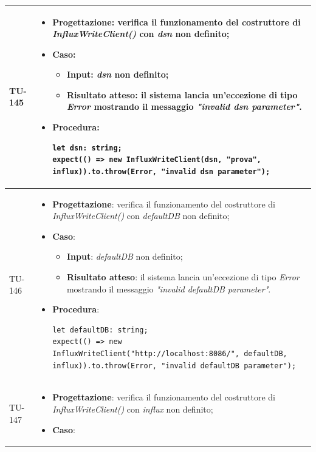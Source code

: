 \begin{longtable}{|C{1.5cm}|C{14.5cm}|}
\\ \hline
{TU-145} &
\begin{itemize}
	\item \textbf{Progettazione}: verifica il funzionamento del costruttore di \emph{InfluxWriteClient()} con \emph{dsn} non definito;
	\item \textbf{Caso}: 
	\begin{itemize}
		\item \textbf{Input}: \emph{dsn} non definito;
		\item \textbf{Risultato atteso}: il sistema lancia un'eccezione di tipo \emph{Error} mostrando il messaggio \emph{"invalid dsn parameter"}.
	\end{itemize}
	\item \textbf{Procedura}:
	\begin{lstlisting}
let dsn: string;
expect(() => new InfluxWriteClient(dsn, "prova", influx)).to.throw(Error, "invalid dsn parameter");
	\end{lstlisting}
\end{itemize}\\
\hline
{TU-146} &
\begin{itemize}
	\item \textbf{Progettazione}: verifica il funzionamento del costruttore di \emph{InfluxWriteClient()} con \emph{defaultDB} non definito;
	\item \textbf{Caso}: 
	\begin{itemize}
		\item \textbf{Input}: \emph{defaultDB} non definito;
		\item \textbf{Risultato atteso}: il sistema lancia un'eccezione di tipo \emph{Error} mostrando il messaggio \emph{"invalid defaultDB parameter"}.
	\end{itemize}
	\item \textbf{Procedura}:
	\begin{lstlisting}
let defaultDB: string;
expect(() => new InfluxWriteClient("http://localhost:8086/", defaultDB, influx)).to.throw(Error, "invalid defaultDB parameter");
	\end{lstlisting}
\end{itemize}\\
\hline
{TU-147} &
\begin{itemize}
	\item \textbf{Progettazione}: verifica il funzionamento del costruttore di \emph{InfluxWriteClient()} con \emph{influx} non definito;
	\item \textbf{Caso}: 
	\begin{itemize}

\end{itemize}
\end{itemize}
\end{longtable}
